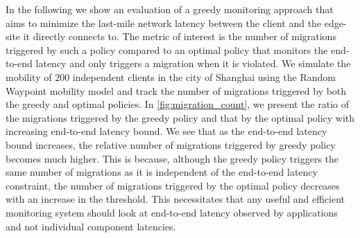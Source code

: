 \par In the following we show an evaluation of a greedy monitoring approach that aims to minimize the last-mile network latency between the client and the edge-site it directly connects to. The metric of interest is the number of migrations triggered by such a policy compared to an optimal policy that monitors the end-to-end latency and only triggers a migration when it is violated. We simulate the mobility of 200 independent clients in the city of Shanghai using the Random Waypoint mobility model and track the number of migrations triggered by both the greedy and optimal policies. In \cref{fig:migration_count}, we present the ratio of the migrations triggered by the greedy policy and that by the optimal policy with increasing end-to-end latency bound. We see that as the end-to-end latency bound increases, the relative number of migrations triggered by greedy policy becomes much higher. This is because, although the greedy policy triggers the same number of migrations as it is independent of the end-to-end latency constraint, the number of migrations triggered by the optimal policy decreases with an increase in the threshold. This necessitates that any useful and efficient monitoring system should look at end-to-end latency observed by applications and not individual component latencies.

